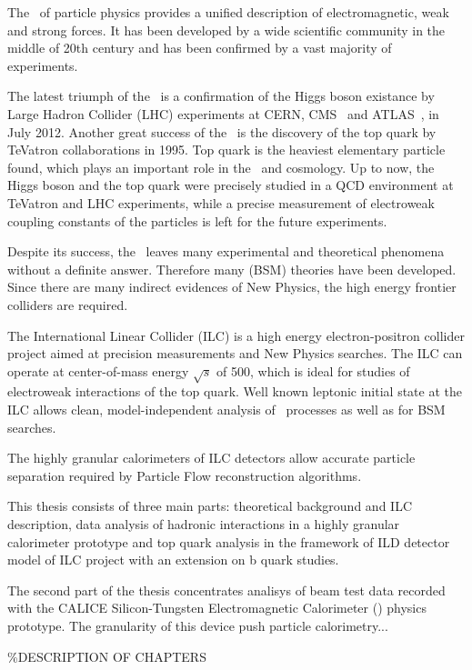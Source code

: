 
The \sm\ of particle physics provides a unified description of electromagnetic, weak and strong forces. It has been developed by a wide scientific community in the middle of 20th century and has been confirmed by a vast majority of experiments. 

The latest triumph of the \sm\ is a confirmation of the Higgs boson existance by Large Hadron Collider (LHC) experiments at CERN, CMS~\cite{bib:HiggsCms} and ATLAS~\cite{bib:HiggsAtlas}, in July 2012.
Another great success of the \sm\ is the discovery of the top quark by TeVatron collaborations in 1995. Top quark is the heaviest elementary particle found, which plays an important role in the \sm\ and cosmology. 
Up to now, the Higgs boson and the top quark were precisely studied in a QCD environment at TeVatron and LHC experiments, while a precise measurement of electroweak coupling constants of the particles is left for the future experiments.

Despite its success, the \sm\ leaves many experimental and theoretical phenomena without a definite answer. Therefore many \bsm (BSM) theories have been developed. 
Since there are many indirect evidences of New Physics, the high energy frontier colliders are required. 

The International Linear Collider \cite{bib:ILC} (ILC) is a high energy electron-positron collider project aimed at precision measurements and New Physics searches. 
The ILC can operate at center-of-mass energy $\sqrt{s}$ of 500\gev, which is ideal for studies of electroweak interactions of the top quark. 
Well known leptonic initial state at the ILC allows clean, model-independent analysis of \sm\ processes as well as for BSM searches. 

The highly granular calorimeters of ILC detectors allow accurate particle separation required by Particle Flow reconstruction algorithms.

This thesis consists of three main parts: theoretical background and ILC description, data analysis of hadronic interactions in a highly granular calorimeter prototype and top quark analysis in the framework of ILD detector model of ILC project with an extension on b quark studies.

The second part of the thesis concentrates analisys of  beam test data recorded with the CALICE Silicon-Tungsten Electromagnetic Calorimeter (\ecal) physics prototype. The granularity of this device push particle calorimetry...

\%DESCRIPTION OF CHAPTERS











